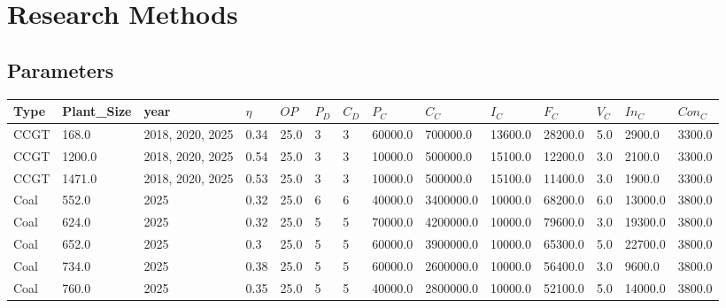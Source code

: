\documentclass[sigconf]{acmart}
\begin{document}
%



% 
\appendix

\section{Research Methods}

\subsection{Parameters}

\begin{table*}[]
	\begin{tabular}{|l|l|l|l|l|l|l|l|l|l|l|l|l|l|}
		\hline
		Type          & Plant\_Size & year             & $\eta$ & $OP$ & $P_D$ & $C_D$ & $P_C$    & $C_C$     & $I_C$    & $F_C$   & $V_C$ & $In_C$  & $Con_C$  \\ \hline
		CCGT          & 168.0       & 2018, 2020, 2025 & 0.34   & 25.0 & 3     & 3     & 60000.0  & 700000.0  & 13600.0  & 28200.0 & 5.0   & 2900.0  & 3300.0   \\ \hline
		CCGT          & 1200.0      & 2018, 2020, 2025 & 0.54   & 25.0 & 3     & 3     & 10000.0  & 500000.0  & 15100.0  & 12200.0 & 3.0   & 2100.0  & 3300.0   \\ \hline
		CCGT          & 1471.0      & 2018, 2020, 2025 & 0.53   & 25.0 & 3     & 3     & 10000.0  & 500000.0  & 15100.0  & 11400.0 & 3.0   & 1900.0  & 3300.0   \\ \hline
		Coal          & 552.0       & 2025             & 0.32   & 25.0 & 6     & 6     & 40000.0  & 3400000.0 & 10000.0  & 68200.0 & 6.0   & 13000.0 & 3800.0   \\ \hline
		Coal          & 624.0       & 2025             & 0.32   & 25.0 & 5     & 5     & 70000.0  & 4200000.0 & 10000.0  & 79600.0 & 3.0   & 19300.0 & 3800.0   \\ \hline
		Coal          & 652.0       & 2025             & 0.3    & 25.0 & 5     & 5     & 60000.0  & 3900000.0 & 10000.0  & 65300.0 & 5.0   & 22700.0 & 3800.0   \\ \hline
		Coal          & 734.0       & 2025             & 0.38   & 25.0 & 5     & 5     & 60000.0  & 2600000.0 & 10000.0  & 56400.0 & 3.0   & 9600.0  & 3800.0   \\ \hline
		Coal          & 760.0       & 2025             & 0.35   & 25.0 & 5     & 5     & 40000.0  & 2800000.0 & 10000.0  & 52100.0 & 5.0   & 14000.0 & 3800.0   \\ \hline

\end{tabular}
\end{table*}
\end{document}
